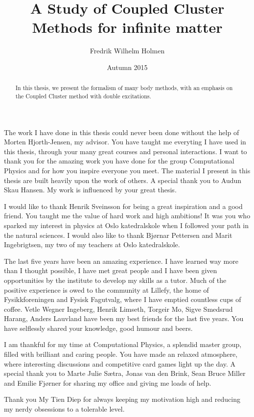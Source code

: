 \documentclass[twoside,english]{uiofysmaster}
\author{Fredrik Wilhelm Holmen}
\title{A Study of Coupled Cluster Methods for infinite matter}
\date{Autumn 2015}
\begin{document}
\setlength{\belowdisplayskip}{12pt} \setlength{\belowdisplayshortskip}{12pt}
\setlength{\abovedisplayskip}{12pt} \setlength{\abovedisplayshortskip}{12pt}


\maketitle

\begin{abstract}
	In this thesis, we present the formalism of many body methods, with an emphasis on the Coupled Cluster method with double excitations. 
\end{abstract}

\begin{acknowledgements}
	The work I have done in this thesis could never been done without the help of Morten Hjorth-Jensen, my advisor. You have taught me everyting I have used in this thesis, through your many great courses and personal interactions. I want to thank you for the amazing work you have done for the group Computational Physics and for how you inspire everyone you meet. The material I present in this thesis are built heavily upon the work of others. A special thank you to Audun Skau Hansen. My work is influenced by your great thesis. 

	I would like to thank Henrik Sveinsson for being a great inspiration and a good friend. You taught me the value of hard work and high ambitions! It was you who sparked my interest in physics at Oslo katedralskole when I followed your path in the natural sciences. I would also like to thank Bjørnar Pettersen and Marit Ingebrigtsen, my two of my teachers at Oslo katedralskole. 

	The last five years have been an amazing experience. I have learned way more than I thought possible, I have met great people and I have been given opportunities by the institute to develop my skills as a tutor. Much of the positive experience is owed to the community at Lillefy, the home of Fysikkforeningen and Fysisk Fagutvalg, where I have emptied countless cups of coffee. Vetle Wegner Ingeberg, Henrik Limseth, Torgeir Mo, Sigve Smedsrud Harang, Anders Lauvland have been my best friends for the last five years. You have selflessly shared your knowledge, good humour and beers. 

	I am thankful for my time at Computational Physics, a splendid master group, filled with brilliant and caring people. You have made an relaxed atmosphere, where interesting discussions and competitive card games light up the day. A special thank you to Marte Julie Sætra, Jonas van den Brink, Sean Bruce Miller and Emilie Fjørner for sharing my office and giving me loads of help. 

	Thank you My Tien Diep for always keeping my motivation high and reducing my nerdy obsessions to a tolerable level.

\end{acknowledgements}
\end{document}
